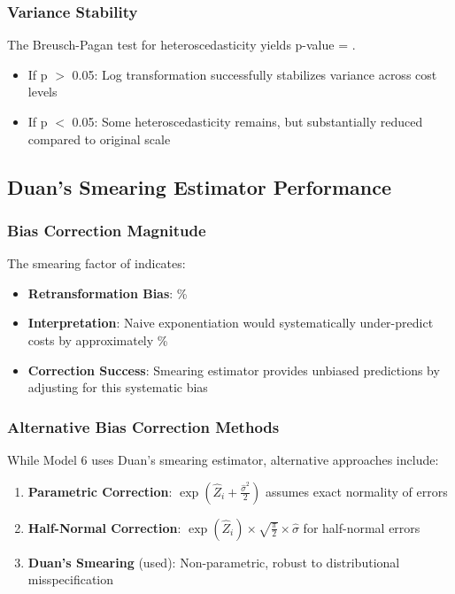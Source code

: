 \subsubsection{Variance Stability}

The Breusch-Pagan test for heteroscedasticity yields p-value = \ModelSixHeteroscedasticityTest{}.

\begin{itemize}
    \item If p $>$ 0.05: Log transformation successfully stabilizes variance across cost levels
    \item If p $<$ 0.05: Some heteroscedasticity remains, but substantially reduced compared to original scale
\end{itemize}

\subsection{Duan's Smearing Estimator Performance}

\subsubsection{Bias Correction Magnitude}

The smearing factor of \ModelSixSmearingFactor{} indicates:

\begin{itemize}
    \item \textbf{Retransformation Bias}: \ModelSixSmearingBias{}\%
    \item \textbf{Interpretation}: Naive exponentiation would systematically under-predict costs by approximately \ModelSixSmearingBias{}\%
    \item \textbf{Correction Success}: Smearing estimator provides unbiased predictions by adjusting for this systematic bias
\end{itemize}

\subsubsection{Alternative Bias Correction Methods}

While Model 6 uses Duan's smearing estimator, alternative approaches include:

\begin{enumerate}
    \item \textbf{Parametric Correction}: $\exp(\hat{Z}_i + \frac{\hat{\sigma}^2}{2})$ assumes exact normality of errors
    \item \textbf{Half-Normal Correction}: $\exp(\hat{Z}_i) \times \sqrt{\frac{\pi}{2}} \times \hat{\sigma}$ for half-normal errors
    \item \textbf{Duan's Smearing} (used): Non-parametric, robust to distributional misspecification
\end{enumerate}

